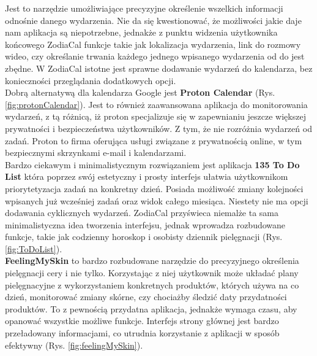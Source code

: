 Jest to narzędzie umożliwiające precyzyjne określenie wszelkich informacji odnośnie danego wydarzenia.
Nie da się kwestionować, że możliwości jakie daje nam aplikacja są niepotrzebne,
jednakże z punktu widzenia użytkownika końcowego ZodiaCal funkcje takie jak lokalizacja wydarzenia,
link do rozmowy wideo, czy określanie trwania każdego jednego wpisanego wydarzenia od do jest zbędne.
W ZodiaCal istotne jest sprawne dodawanie wydarzeń do kalendarza, bez konieczności przeglądania dodatkowych opcji.\\

Dobrą alternatywą dla kalendarza Google jest \textbf{Proton Calendar} (Rys. \ref{fig:protonCalendar}).
Jest to również zaawansowana aplikacja do monitorowania wydarzeń, z tą różnicą,
iż proton specjalizuje się w zapewnianiu jeszcze większej prywatności i bezpieczeństwa użytkowników.
Z tym, że nie rozróżnia wydarzeń od zadań. Proton to firma oferująca usługi związane
z prywatnością online, w tym bezpiecznymi skrzynkami e-mail i kalendarzami.\\


Bardzo ciekawym i minimalistycznym rozwiązaniem jest aplikacja \textbf{135 To Do List} która poprzez swój estetyczny
i prosty interfejs ułatwia użytkownikom priorytetyzacja zadań na konkretny dzień.
Posiada możliwość zmiany kolejności wpisanych już wcześniej zadań oraz widok całego miesiąca.
Niestety nie ma opcji dodawania cyklicznych wydarzeń. ZodiaCal przyświeca niemalże ta sama minimalistyczna
idea tworzenia interfejsu, jednak wprowadza rozbudowane funkcje, takie jak codzienny horoskop i osobisty dziennik pielęgnacji (Rys. \ref{fig:ToDoList}).\\

\textbf{FeelingMySkin} to bardzo rozbudowane narzędzie do precyzyjnego określenia pielęgnacji cery i nie tylko.
Korzystając z niej użytkownik może układać plany pielęgnacyjne z wykorzystaniem konkretnych produktów,
których używa na co dzień,  monitorować zmiany skórne, czy chociażby śledzić daty przydatności produktów.
To z pewnością przydatna aplikacja, jednakże wymaga czasu, aby opanować wszystkie możliwe funkcje.
Interfejs strony głównej jest bardzo przeładowany informacjami, co utrudnia korzystanie z aplikacji w sposób efektywny (Rys. \ref{fig:feelingMySkin}).\\

